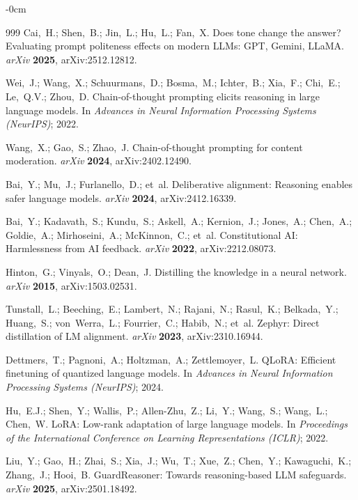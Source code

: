 \documentclass[superintelligence,article,submit,pdftex,moreauthors]{Definitions/mdpi}
\begin{document}
\begin{adjustwidth}{-\extralength}{0cm}
{\begin{thebibliography}{999}
Cai,~H.; Shen,~B.; Jin,~L.; Hu,~L.; Fan,~X.
Does tone change the answer? {E}valuating prompt politeness effects on modern {LLMs}: {GPT}, {Gemini}, {LLaMA}.
{\em arXiv} {\bf 2025}, arXiv:2512.12812.

Wei,~J.; Wang,~X.; Schuurmans,~D.; Bosma,~M.; Ichter,~B.; Xia,~F.; Chi,~E.; Le,~Q.V.; Zhou,~D.
Chain-of-thought prompting elicits reasoning in large language models.
In {\em Advances in Neural Information Processing Systems (NeurIPS)}; 2022.

Wang,~X.; Gao,~S.; Zhao,~J.
Chain-of-thought prompting for content moderation.
{\em arXiv} {\bf 2024}, arXiv:2402.12490.

Bai,~Y.; Mu,~J.; Furlanello,~D.; et~al.
Deliberative alignment: Reasoning enables safer language models.
{\em arXiv} {\bf 2024}, arXiv:2412.16339.

Bai,~Y.; Kadavath,~S.; Kundu,~S.; Askell,~A.; Kernion,~J.; Jones,~A.; Chen,~A.; Goldie,~A.; Mirhoseini,~A.; McKinnon,~C.; et~al.
Constitutional {AI}: Harmlessness from {AI} feedback.
{\em arXiv} {\bf 2022}, arXiv:2212.08073.

Hinton,~G.; Vinyals,~O.; Dean,~J.
Distilling the knowledge in a neural network.
{\em arXiv} {\bf 2015}, arXiv:1503.02531.

Tunstall,~L.; Beeching,~E.; Lambert,~N.; Rajani,~N.; Rasul,~K.; Belkada,~Y.; Huang,~S.; von~Werra,~L.; Fourrier,~C.; Habib,~N.; et~al.
Zephyr: Direct distillation of {LM} alignment.
{\em arXiv} {\bf 2023}, arXiv:2310.16944.

Dettmers,~T.; Pagnoni,~A.; Holtzman,~A.; Zettlemoyer,~L.
{QLoRA}: Efficient finetuning of quantized language models.
In {\em Advances in Neural Information Processing Systems (NeurIPS)}; 2024.

Hu,~E.J.; Shen,~Y.; Wallis,~P.; Allen-Zhu,~Z.; Li,~Y.; Wang,~S.; Wang,~L.; Chen,~W.
{LoRA}: Low-rank adaptation of large language models.
In {\em Proceedings of the International Conference on Learning Representations (ICLR)}; 2022.

Liu,~Y.; Gao,~H.; Zhai,~S.; Xia,~J.; Wu,~T.; Xue,~Z.; Chen,~Y.; Kawaguchi,~K.; Zhang,~J.; Hooi,~B.
{GuardReasoner}: Towards reasoning-based {LLM} safeguards.
{\em arXiv} {\bf 2025}, arXiv:2501.18492.


\end{thebibliography}}
\end{adjustwidth}
\end{document}
